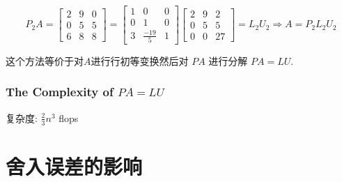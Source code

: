 \begin{example}[$PA=LU$]
    \begin{equation} P_{2} A=\left[\begin{array}{lll}2 & 9 & 0 \\ 0 & 5 & 5 \\ 6 & 8 & 8\end{array}\right]=\left[\begin{array}{ccc}1 & 0 & 0 \\ 0 & 1 & 0 \\ 3 & \frac{-19}{5} & 1\end{array}\right]\left[\begin{array}{ccc}2 & 9 & 2 \\ 0 & 5 & 5 \\ 0 & 0 & 27\end{array}\right]=L_{2} U_{2} \Rightarrow A=P_{2} L_{2} U_{2} \end{equation}

\end{example}


\begin{theorem}
    这个方法等价于对$A$进行行初等变换然后对 $ P A $ 进行分解 $ P A=L U $.
\end{theorem}

\subsubsection{The Complexity of $PA = LU$}

\label{complexity:PA-eqs-LU}

复杂度: $ \frac{2}{3} n^{3} $ flops



\section{舍入误差的影响}

